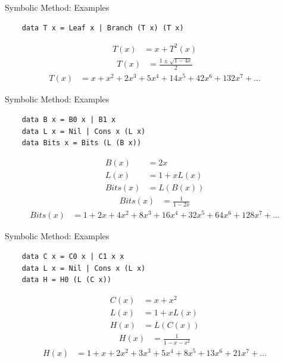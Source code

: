 \documentclass[pdf]{beamer}
\begin{document}
\begin{frame}[fragile]{Symbolic Method: Examples}
  \begin{verbatim}
    data T x = Leaf x | Branch (T x) (T x)
  \end{verbatim}
  \pause
  \begin{align*}
    T(x) &= x + T^2(x)
  \end{align*}
  \pause
  \begin{align*}
    T(x) &= \frac{1 \pm \sqrt{1 - 4 x}}{2}
  \end{align*}
  \pause
  \begin{align*}
    T(x) &= x + x^2 + 2 x^3 + 5 x^4 + 14 x^5 + 42 x^6 + 132 x^7 +...
  \end{align*}
\end{frame}

\begin{frame}[fragile]{Symbolic Method: Examples}
  \begin{verbatim}
    data B x = B0 x | B1 x
    data L x = Nil | Cons x (L x)
    data Bits x = Bits (L (B x))
  \end{verbatim}
  \pause
  \begin{align*}
    B(x) &= 2 x \\
    L(x) &= 1 + x L(x) \\
    Bits(x) &= L(B(x))
  \end{align*}
  \pause
  \begin{align*}
    Bits(x) &= \frac{1}{1 - 2x}
  \end{align*}
  \pause
  \begin{align*}
    Bits(x) &= 1 + 2 x + 4 x^2 + 8 x^3 + 16 x^4 + 32 x^5 + 64 x^6 + 128 x^7 +...
  \end{align*}
\end{frame}

\begin{frame}[fragile]{Symbolic Method: Examples}
  \begin{verbatim}
    data C x = C0 x | C1 x x
    data L x = Nil | Cons x (L x)
    data H = H0 (L (C x))
  \end{verbatim}
  \pause
  \begin{align*}
    C(x) &= x + x^2 \\
    L(x) &= 1 + x L(x) \\
    H(x) &= L(C(x))
  \end{align*}
  \pause
  \begin{align*}
    H(x) &= \frac{1}{1 - x - x^2}
  \end{align*}
  \pause
  \begin{align*}
    H(x) &= 1 + x + 2 x^2 + 3 x^3 + 5 x^4 + 8 x^5 + 13 x^6 + 21 x^7 +...
  \end{align*}
\end{frame}
\end{document}
